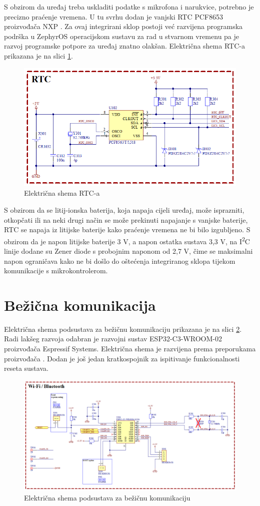 S obzirom da uređaj treba uskladiti podatke s mikrofona i narukvice, potrebno je precizno praćenje vremena. U tu svrhu dodan je vanjski RTC PCF8653 proizvođača NXP \cite{nxp:pcf8654}. Za ovaj integrirani sklop postoji već razvijena programska podrška u ZephyrOS operacijskom sustavu za rad u stvarnom vremenu pa je razvoj programske potpore za uređaj znatno olakšan. Električna shema RTC-a prikazana je na slici \ref{slk:RTC}.
\begin{figure}[hbt]
    \centering
    \includegraphics[width=10 cm]{Figures/RTC.png}
    \caption{Električna shema RTC-a}
    \label{slk:RTC}
\end{figure}
S obzirom da se litij-ionska baterija, koja napaja cijeli uređaj, može isprazniti, otkopčati ili na neki drugi način se može prekinuti napajanje s vanjske baterije, RTC se napaja iz litijske baterije kako praćenje vremena ne bi bilo izgubljeno. S obzirom da je napon litijske baterije 3 V, a napon ostatka sustava 3,3 V, na I\textsuperscript{2}C linije dodane su Zener diode s probojnim naponom od 2,7 V, čime se maksimalni napon ograničava kako ne bi došlo do oštećenja integriranog sklopa tijekom komunikacije s mikrokontrolerom.

\section{Bežična komunikacija}
Električna shema podsustava za bežičnu komunikaciju prikazana je na slici \ref{slk:WIFI}. Radi lakšeg razvoja odabran je razvojni sustav ESP32-C3-WROOM-02 proizvođača Espressif Systems. Električna shema je razvijena prema preporukama proizvođača \cite{espressif:wroom02}. Dodan je još jedan kratkospojnik za ispitivanje funkcionalnosti reseta sustava.
\begin{figure}[!hbt]
    \centering
    \includegraphics[width=\textwidth]{Figures/WIRELESS.png}
    \caption{Električna shema podsustava za bežičnu komunikaciju}
    \label{slk:WIFI}
\end{figure}

